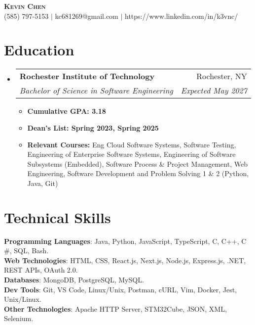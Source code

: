 \documentclass[letterpaper,11pt]{article}
\makeatletter
\newcommand{\resumeItem}[1]{
  \item\small{
    {#1 \vspace{-2pt}}
  }
}
\newcommand{\resumeSubheading}[4]{
  \vspace{-2pt}\item
    \begin{tabular*}{0.97\textwidth}[t]{l@{\extracolsep{\fill}}r}
      \textbf{#1} & #2 \\
      \textit{\small#3} & \textit{\small #4} \\
    \end{tabular*}\vspace{-7pt}
}
\newcommand{\resumeSubHeadingListStart}{\begin{itemize}[leftmargin=0.15in, label={}]}
\newcommand{\resumeSubHeadingListEnd}{\end{itemize}}
\newcommand{\resumeItemListStart}{\begin{itemize}}
\newcommand{\resumeItemListEnd}{\end{itemize}\vspace{-5pt}}
\makeatother
\begin{document}

\begin{center}
    \textbf{\Huge \scshape Kevin Chen} \\ \vspace{1pt}
    \small (585) 797-5153 $|$ kc681269@gmail.com $|$ 
    https://www.linkedin.com/in/k3vnc/ 
\end{center}


\section{Education}
  \resumeSubHeadingListStart
    \resumeSubheading
      {Rochester Institute of Technology}{Rochester, NY}
      {Bachelor of Science in Software Engineering}{Expected May 2027}
      \resumeItemListStart
        \resumeItem{\textbf{Cumulative GPA: 3.18}}
        \resumeItem{\textbf{Dean's List: Spring 2023, Spring 2025}}
        \resumeItem{\textbf{Relevant Courses:} Eng Cloud Software Systems, Software Testing, Engineering of Enterprise Software Systems, Engineering of Software Subsystems (Embedded), Software Process \& Project Management, Web Engineering, Software Development and Problem Solving 1 \& 2 (Python, Java, Git)}
      \resumeItemListEnd
  \resumeSubHeadingListEnd

\section{Technical Skills}
\begin{itemize}[leftmargin=0.15in, label={}]
\small{\item{
\textbf{Programming Languages}{: Java, Python, JavaScript, TypeScript, C, C++, C\\#, SQL, Bash.} \\
\textbf{Web Technologies}{: HTML, CSS, React.js, Next.js, Node.js, Express.js, .NET, REST APIs, OAuth 2.0.} \\
\textbf{Databases}{: MongoDB, PostgreSQL, MySQL.} \\
\textbf{Dev Tools}{: Git, VS Code, Linux/Unix, Postman, cURL, Vim, Docker, Jest, Unix/Linux.} \\
\textbf{Other Technologies}{: Apache HTTP Server, STM32Cube, JSON, XML, Selenium.}}}\\
\end{itemize}
\end{document}
